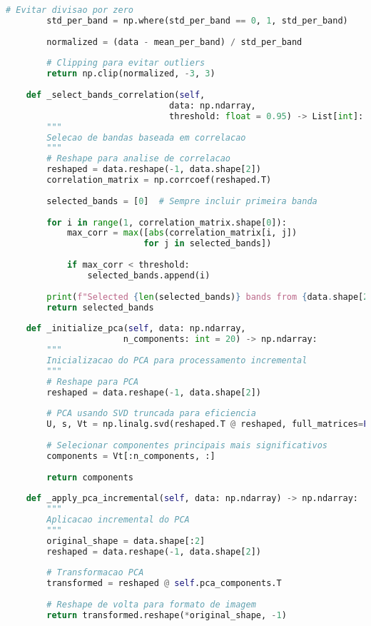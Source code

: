 \begin{lstlisting}[language=Python]
        # Evitar divisao por zero
        std_per_band = np.where(std_per_band == 0, 1, std_per_band)
        
        normalized = (data - mean_per_band) / std_per_band
        
        # Clipping para evitar outliers
        return np.clip(normalized, -3, 3)
    
    def _select_bands_correlation(self, 
                                data: np.ndarray, 
                                threshold: float = 0.95) -> List[int]:
        """
        Selecao de bandas baseada em correlacao
        """
        # Reshape para analise de correlacao
        reshaped = data.reshape(-1, data.shape[2])
        correlation_matrix = np.corrcoef(reshaped.T)
        
        selected_bands = [0]  # Sempre incluir primeira banda
        
        for i in range(1, correlation_matrix.shape[0]):
            max_corr = max([abs(correlation_matrix[i, j]) 
                           for j in selected_bands])
            
            if max_corr < threshold:
                selected_bands.append(i)
        
        print(f"Selected {len(selected_bands)} bands from {data.shape[2]}")
        return selected_bands
    
    def _initialize_pca(self, data: np.ndarray, 
                       n_components: int = 20) -> np.ndarray:
        """
        Inicializacao do PCA para processamento incremental
        """
        # Reshape para PCA
        reshaped = data.reshape(-1, data.shape[2])
        
        # PCA usando SVD truncada para eficiencia
        U, s, Vt = np.linalg.svd(reshaped.T @ reshaped, full_matrices=False)
        
        # Selecionar componentes principais mais significativos
        components = Vt[:n_components, :]
        
        return components
    
    def _apply_pca_incremental(self, data: np.ndarray) -> np.ndarray:
        """
        Aplicacao incremental do PCA
        """
        original_shape = data.shape[:2]
        reshaped = data.reshape(-1, data.shape[2])
        
        # Transformacao PCA
        transformed = reshaped @ self.pca_components.T
        
        # Reshape de volta para formato de imagem
        return transformed.reshape(*original_shape, -1)
    

\end{lstlisting}
